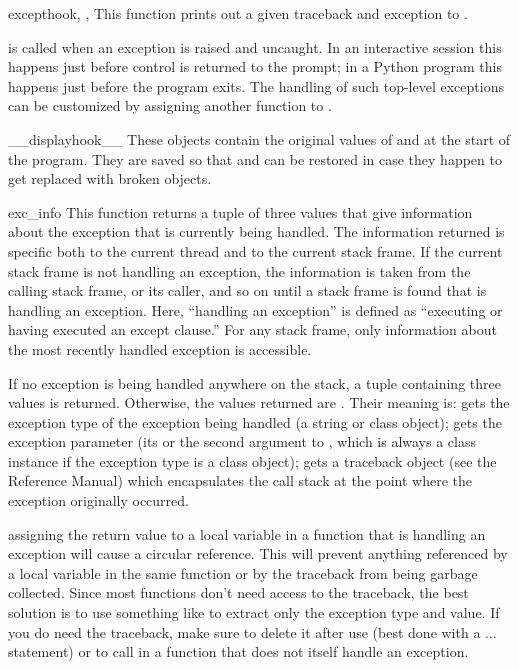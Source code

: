 \begin{funcdesc}{excepthook}{, , }
This function prints out a given traceback and exception to
.

 is called when an exception is raised
and uncaught.  In an interactive session this happens just before
control is returned to the prompt; in a Python program this happens
just before the program exits.
The handling of such top-level exceptions can be customized by
assigning another function to .
\end{funcdesc}

\begin{datadesc}{__displayhook__}
These objects contain the original values of 
and  at the start of the program.  They are saved
so that  and  can be restored
in case they happen to get replaced with broken objects.
\end{datadesc}

\begin{funcdesc}{exc_info}{}
This function returns a tuple of three values that give information
about the exception that is currently being handled.  The information
returned is specific both to the current thread and to the current
stack frame.  If the current stack frame is not handling an exception,
the information is taken from the calling stack frame, or its caller,
and so on until a stack frame is found that is handling an exception.
Here, ``handling an exception'' is defined as ``executing or having
executed an except clause.''  For any stack frame, only
information about the most recently handled exception is accessible.

If no exception is being handled anywhere on the stack, a tuple
containing three  values is returned.  Otherwise, the
values returned are
.
Their meaning is:  gets the exception type of the exception
being handled (a string or class object);  gets the
exception parameter (its  or the second argument
to , which is always a class instance if the exception
type is a class object);  gets a traceback object (see
the Reference Manual) which encapsulates the call stack at the point
where the exception originally occurred.

 assigning the  return value to a
local variable in a function that is handling an exception will cause
a circular reference. This will prevent anything referenced by a local
variable in the same function or by the traceback from being garbage
collected.  Since most functions don't need access to the traceback,
the best solution is to use something like
to extract only the exception type and value.  If you do need the
traceback, make sure to delete it after use (best done with a
 ...  statement) or to call
 in a function that does not itself handle an
exception.
\end{funcdesc}

